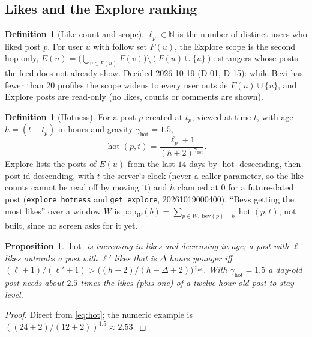 \documentclass[11pt]{article}
\DeclareMathOperator{\hot}{hot}
\newcommand{\code}[1]{\texttt{#1}}
\newcommand{\N}{\mathbb{N}}
\theoremstyle{plain}
\newtheorem{proposition}[theorem]{Proposition}
\theoremstyle{definition}
\newtheorem{definition}[theorem]{Definition}
\theoremstyle{remark}
\begin{document}
\subsection{Likes and the Explore ranking}\label{sec:likes}

\begin{definition}[Like count and scope]
$\ell_p \in \N$ is the number of distinct users who liked post $p$. For user $u$ with follow set $F(u)$, the Explore scope is the second hop only, $E(u) = \bigl(\bigcup_{v \in F(u)} F(v)\bigr) \setminus (F(u) \cup \{u\})$: strangers whose posts the feed does not already show. Decided 2026-10-19 (D-01, D-15): while Bevi has fewer than $20$ profiles the scope widens to every user outside $F(u) \cup \{u\}$, and Explore posts are read-only (no likes, counts or comments are shown).
\end{definition}

\begin{definition}[Hotness]
For a post $p$ created at $t_p$, viewed at time $t$, with age $h = (t - t_p)$ in hours and gravity $\gamma_{\mathrm{hot}} = 1.5$,
\begin{equation}\label{eq:hot}
\hot(p, t) = \frac{\ell_p + 1}{(h + 2)^{\gamma_{\mathrm{hot}}}} .
\end{equation}
Explore lists the posts of $E(u)$ from the last $14$ days by $\hot$ descending, then post id descending, with $t$ the server's clock (never a caller parameter, so the like counts cannot be read off by moving it) and $h$ clamped at $0$ for a future-dated post (\code{explore\_hotness} and \code{get\_explore}, 20261019000400). ``Bevs getting the most likes'' over a window $W$ is $\mathrm{pop}_W(b) = \sum_{p \in W,\ \mathrm{bev}(p) = b} \hot(p, t)$; not built, since no screen asks for it yet.
\end{definition}

\begin{proposition}
$\hot$ is increasing in likes and decreasing in age; a post with $\ell$ likes outranks a post with $\ell'$ likes that is $\Delta$ hours younger iff $(\ell + 1)/(\ell' + 1) > \bigl((h+2)/(h - \Delta + 2)\bigr)^{\gamma_{\mathrm{hot}}}$. With $\gamma_{\mathrm{hot}} = 1.5$ a day-old post needs about $2.5$ times the likes (plus one) of a twelve-hour-old post to stay level.
\end{proposition}
\begin{proof}
Direct from \eqref{eq:hot}; the numeric example is $((24+2)/(12+2))^{1.5} \approx 2.53$.
\end{proof}
\end{document}
